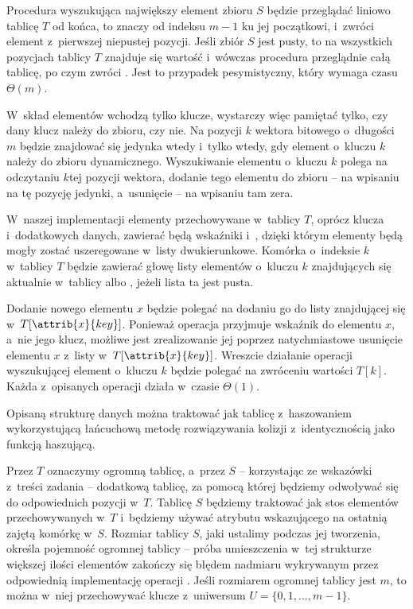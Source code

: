 
\exercise %
Procedura wyszukująca największy element zbioru $S$ będzie przeglądać liniowo tablicę $T$ od końca, to znaczy od indeksu $m-1$ ku jej początkowi, i~zwróci element z~pierwszej niepustej pozycji.
Jeśli zbiór $S$ jest pusty, to na wszystkich pozycjach tablicy $T$ znajduje się wartość  i~wówczas procedura przeglądnie całą tablicę, po czym zwróci .
Jest to przypadek pesymistyczny, który wymaga czasu $\Theta(m)$.

\exercise %
W~skład elementów wchodzą tylko klucze, wystarczy więc pamiętać tylko, czy dany klucz należy do zbioru, czy nie.
Na pozycji $k$ wektora bitowego o~długości $m$ będzie znajdować się jedynka wtedy i~tylko wtedy, gdy element o~kluczu $k$ należy do zbioru dynamicznego.
Wyszukiwanie elementu o~kluczu $k$ polega na odczytaniu $k$\nbhyphen tej pozycji wektora, dodanie tego elementu do zbioru -- na wpisaniu na tę pozycję jedynki, a~usunięcie -- na wpisaniu tam zera.

\exercise %
W~naszej implementacji elementy przechowywane w~tablicy $T$, oprócz klucza i~dodatkowych danych, zawierać będą wskaźniki  i~, dzięki którym elementy będą mogły zostać uszeregowane w~listy dwukierunkowe.
Komórka o~indeksie $k$ w~tablicy $T$ będzie zawierać głowę listy elementów o~kluczu $k$ znajdujących się aktualnie w~tablicy albo , jeżeli lista ta jest pusta.

Dodanie nowego elementu $x$ będzie polegać na dodaniu go do listy znajdującej się w~$T[\attrib{x}{key}]$.
Ponieważ operacja  przyjmuje wskaźnik do elementu $x$, a~nie jego klucz, możliwe jest zrealizowanie jej poprzez natychmiastowe usunięcie elementu $x$ z~listy w~$T[\attrib{x}{key}]$.
Wreszcie działanie operacji wyszukującej element o~kluczu $k$ będzie polegać na zwróceniu wartości $T[k]$.
Każda z~opisanych operacji działa w~czasie $\Theta(1)$.

Opisaną strukturę danych można traktować jak tablicę z~haszowaniem wykorzystującą łańcuchową metodę rozwiązywania kolizji z~identycznością jako funkcją haszującą.

\exercise %

\noindent Przez $T$ oznaczymy ogromną tablicę, a~przez $S$ -- korzystając ze wskazówki z~treści zadania -- dodatkową tablicę, za pomocą której będziemy odwoływać się do odpowiednich pozycji w~$T$.
Tablicę $S$ będziemy traktować jak stos elementów przechowywanych w~$T$ i~będziemy używać atrybutu  wskazującego na ostatnią zajętą komórkę w~$S$.
Rozmiar tablicy $S$, jaki ustalimy podczas jej tworzenia, określa pojemność ogromnej tablicy -- próba umieszczenia w~tej strukturze większej ilości elementów zakończy się błędem nadmiaru wykrywanym przez odpowiednią implementację operacji .
Jeśli rozmiarem ogromnej tablicy jest $m$, to można w~niej przechowywać klucze z~uniwersum $U=\{0,1,\dots,m-1\}$.


